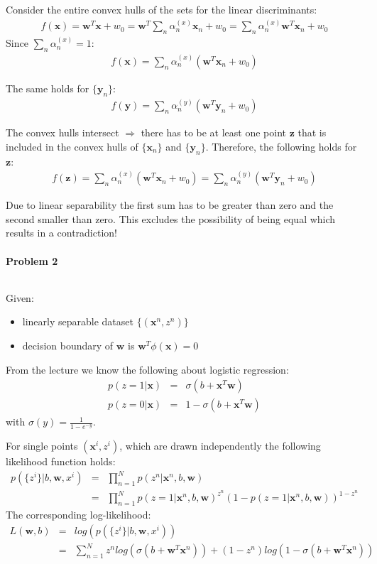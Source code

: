 \documentclass{article}
\renewcommand{\Vec}[1]{\ensuremath{\mathbf{#1}}}
\begin{document}
Consider the entire convex hulls of the sets for the linear discriminants:
\begin{eqnarray}
f(\Vec{x}) = \Vec{w}^T \Vec{x} + w_0 = \Vec{w}^T \sum_n \alpha^{(x)}_n \Vec{x}_n + w_0 = \sum_n \alpha^{(x)}_n \Vec{w}^T \Vec{x}_n + w_0
\end{eqnarray}
Since $\sum_n \alpha^{(x)}_n = 1$:
\begin{eqnarray}
f(\Vec{x}) = \sum_n \alpha^{(x)}_n (\Vec{w}^T \Vec{x}_n + w_0)
\end{eqnarray}

The same holds for $\{\Vec{y}_n\}$:
\begin{eqnarray}
f(\Vec{y}) = \sum_n \alpha^{(y)}_n (\Vec{w}^T \Vec{y}_n + w_0)
\end{eqnarray}

The convex hulls intersect $\Rightarrow$ there has to be at least one point $\Vec{z}$ that is included in the convex hulls of $\{\Vec{x}_n\}$ and $\{\Vec{y}_n\}$. Therefore, the following holds for $\Vec{z}$:
\begin{eqnarray}
f(\Vec{z}) = \sum_n \alpha^{(x)}_n (\Vec{w}^T \Vec{x}_n + w_0) = \sum_n \alpha^{(y)}_n (\Vec{w}^T \Vec{y}_n + w_0)
\label{point_z}
\end{eqnarray}

Due to linear separability the first sum has to be greater than zero and the second smaller than zero. This excludes the possibility of being equal which results in a contradiction!


\paragraph*{Problem 2}
$\;$ 

Given:
\begin{itemize}
\item linearly separable dataset $\{(\Vec{x}^n, z^n)\}$
\item decision boundary of $\Vec{w}$ is $\Vec{w}^T \phi(\Vec{x}) = 0$
\end{itemize}

From the lecture we know the following about logistic regression:
\begin{eqnarray}
p(z=1 |\Vec{x}) &=& \sigma(b+\Vec{x}^T\Vec{w})\\
p(z=0 |\Vec{x}) &=& 1 - \sigma(b+\Vec{x}^T\Vec{w})
\end{eqnarray}
with $\sigma(y) = \frac{1}{1-e^{-y}}$.

For single points $(\Vec{x}^i, z^i)$, which are drawn independently the following likelihood function holds:
\begin{eqnarray}
p(\{z^i\} | b, \Vec{w}, {x^i}) &=& \prod_{n=1}^N p(z^n | \Vec{x}^n, b, \Vec{w})\\
&=& \prod_{n=1}^N p(z=1 | \Vec{x}^n, b, \Vec{w})^{z^n}(1-p(z=1 | \Vec{x}^n, b, \Vec{w}))^{1-z^n}
\end{eqnarray}
The corresponding log-likelihood:
\begin{eqnarray}
L(\Vec{w}, b) &=& log (p(\{z^i\} | b, \Vec{w}, {x^i}))\\
&=& \sum_{n = 1}^N z^n log (\sigma(b+\Vec{w}^T\Vec{x}^n)) + (1-z^n) log(1-\sigma(b+\Vec{w}^T\Vec{x}^n))
\end{eqnarray}
\end{document}
